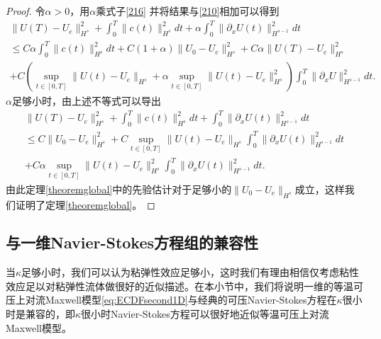 \begin{proof}
令$\alpha>0$，用$\alpha$乘式子\eqref{216} 并将结果与\eqref{210}相加可以得到
\begin{eqnarray*}
  \|U(T)-U_e\|_{H^s}^2 + \int_0^T \|c(t)\|_{H^s}^2 dt + \alpha \int_0^T \|\partial_x U(t)\|_{H^{s-1}}^2 dt \\
  \le C \alpha \int_0^T \|c(t)\|_{H^s}^2 dt +C(1+\alpha)\|U_0 -U_e\|_{H^s}^2 + C \alpha \|U(T)-U_e\|_{H^s}^2  \\ + C(\sup_{t \in [0,T]} \|U(t)-U_e\|_{H^s} + \alpha \sup_{t \in [0,T]} \|U(t)-U_e\|_{H^s}^2)  \int_0^T \|\partial_x U\|_{H^{s-1}}^2 dt.
\end{eqnarray*}
$\alpha$足够小时，由上述不等式可以导出
\begin{eqnarray*}
  \|U(T)-U_e\|_{H^s}^2 + \int_0^T \|c(t)\|_{H^s}^2 dt + \int_0^T \|\partial_x U(t)\|_{H^{s-1}}^2 dt \\
  \le C \|U_0-U_e\|_{H^s}^2 + C \sup_{t \in [0,T]} \|U(t)-U_e\|_{H^s} \int_0^T \|\partial_x U(t)\|_{H^{s-1}}^2 dt \\
  +C\alpha  \sup_{t \in [0,T]} \|U(t)-U_e\|_{H^s}^2 \int_0^T \|\partial_x U(t)\|_{H^{s-1}}^2 dt.
\end{eqnarray*}
由此定理\ref{theoremglobal}中的先验估计对于足够小的$\|U_0 -U_e\|_{H^s}$成立，这样我们证明了定理\ref{theoremglobal}。
\end{proof}

\subsection{与一维Navier-Stokes方程组的兼容性}

当$\kappa$足够小时，我们可以认为粘弹性效应足够小，这时我们有理由相信仅考虑粘性效应足以对粘弹性流体做很好的近似描述。在本小节中，我们将说明一维的等温可压上对流Maxwell模型\eqref{eq:ECDFsecond1D}与经典的可压Navier-Stokes方程在$\kappa$很小时是兼容的，即$\kappa$很小时Navier-Stokes方程可以很好地近似等温可压上对流Maxwell模型。

